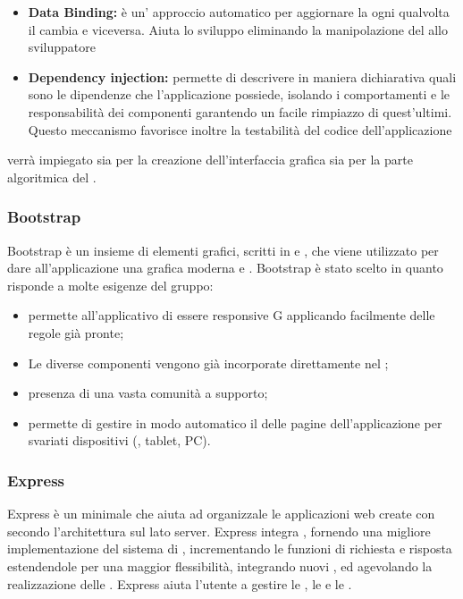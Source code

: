 \documentclass[12pt,a4paper]{article}
\begin{document}
\begin{itemize}
	\item \textbf{Data Binding:} è un’ approccio automatico per aggiornare la  ogni qualvolta il  cambia e viceversa. Aiuta lo sviluppo eliminando la manipolazione del  allo sviluppatore
	\item \textbf{Dependency injection:} permette di descrivere in maniera dichiarativa quali sono le
	dipendenze che l’applicazione possiede, isolando i comportamenti e le responsabilità dei componenti garantendo un facile rimpiazzo di quest’ultimi. Questo meccanismo favorisce inoltre la testabilità del codice dell’applicazione	
\end{itemize}

 verrà impiegato sia per la creazione dell’interfaccia grafica sia per la parte algoritmica del .

\subsubsection{Bootstrap}\label{bootstrap}
Bootstrap è un insieme di elementi grafici, scritti in  e , che viene utilizzato per dare all'applicazione una grafica moderna e . Bootstrap è stato scelto in quanto risponde a molte esigenze del gruppo:

\begin{itemize}
	\item permette all’applicativo di essere responsive G applicando facilmente delle regole già pronte;
	\item Le diverse componenti vengono già incorporate direttamente nel  ;
	\item presenza di una vasta comunità a supporto;
	\item permette di gestire in modo automatico il  delle pagine dell'applicazione per svariati dispositivi (, tablet, PC).
\end{itemize}

\subsubsection{Express}\label{express}
Express è un  minimale che aiuta ad organizzale le applicazioni web create con  secondo l'architettura  sul lato server. Express integra , fornendo una migliore implementazione del sistema di , incrementando le funzioni di richiesta e risposta estendendole per una maggior flessibilità, integrando nuovi , ed agevolando la realizzazione delle . Express aiuta l'utente a gestire le , le  e le .
\end{document}
